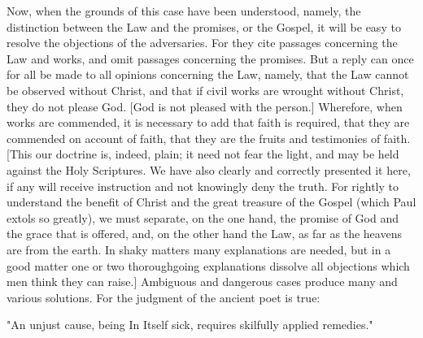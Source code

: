 Now, when the grounds of this case have been understood, namely, the
distinction between the Law and the promises, or the Gospel, it will
be easy to resolve the objections of the adversaries.  For they cite
passages concerning the Law and works, and omit passages concerning
the promises.  But a reply can once for all be made to all opinions
concerning the Law, namely, that the Law cannot be observed without
Christ, and that if civil works are wrought without Christ, they do
not please God.  [God is not pleased with the person.] Wherefore,
when works are commended, it is necessary to add that faith is
required, that they are commended on account of faith, that they are
the fruits and testimonies of faith.  [This our doctrine is, indeed,
plain; it need not fear the light, and may be held against the Holy
Scriptures.  We have also clearly and correctly presented it here, if
any will receive instruction and not knowingly deny the truth.  For
rightly to understand the benefit of Christ and the great treasure of
the Gospel (which Paul extols so greatly), we must separate, on the
one hand, the promise of God and the grace that is offered, and, on
the other hand the Law, as far as the heavens are from the earth.  In
shaky matters many explanations are needed, but in a good matter one
or two thoroughgoing explanations dissolve all objections which men
think they can raise.] Ambiguous and dangerous cases produce many and
various solutions.  For the judgment of the ancient poet is true:

"An unjust cause, being In Itself sick, requires skilfully applied
remedies."

